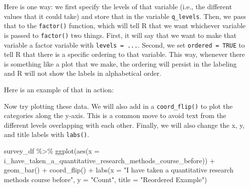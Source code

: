 \documentclass[
]{book}
\newenvironment{Shaded}{\begin{snugshade}}{\end{snugshade}}
\newcommand{\AttributeTok}[1]{\textcolor[rgb]{0.77,0.63,0.00}{#1}}
\newcommand{\ConstantTok}[1]{\textcolor[rgb]{0.00,0.00,0.00}{#1}}
\newcommand{\FunctionTok}[1]{\textcolor[rgb]{0.00,0.00,0.00}{#1}}
\newcommand{\NormalTok}[1]{#1}
\newcommand{\OtherTok}[1]{\textcolor[rgb]{0.56,0.35,0.01}{#1}}
\newcommand{\SpecialCharTok}[1]{\textcolor[rgb]{0.00,0.00,0.00}{#1}}
\newcommand{\StringTok}[1]{\textcolor[rgb]{0.31,0.60,0.02}{#1}}
\begin{document}
Here is one way: we first specify the levels of that variable (i.e., the different values that it could take) and store that in the variable \texttt{q\_levels}. Then, we pass that to the \texttt{factor()} function, which will tell R that we want whichever variable is passed to \texttt{factor()} two things. First, it will say that we want to make that variable a factor variable with \texttt{levels\ =\ ...}. Second, we set \texttt{ordered\ =\ TRUE} to tell R that there is a specific ordering to that variable. This way, whenever there is something like a plot that we make, the ordering will persist in the labeling and R will not show the labels in alphabetical order.

Here is an example of that in action:

\begin{Shaded}
\end{Shaded}

Now try plotting these data. We will also add in a \texttt{coord\_flip()} to plot the categories along the y-axis. This is a common move to avoid text from the different levels overlapping with each other. Finally, we will also change the x, y, and title labels with \texttt{labs()}.

\begin{Shaded}
\begin{Highlighting}[]
\NormalTok{survey\_df }\SpecialCharTok{\%\textgreater{}\%} 
  \FunctionTok{ggplot}\NormalTok{(}\FunctionTok{aes}\NormalTok{(}\AttributeTok{x =}\NormalTok{ i\_have\_taken\_a\_quantitative\_research\_methods\_course\_before)) }\SpecialCharTok{+}
  \FunctionTok{geom\_bar}\NormalTok{() }\SpecialCharTok{+}
  \FunctionTok{coord\_flip}\NormalTok{() }\SpecialCharTok{+}
  \FunctionTok{labs}\NormalTok{(}\AttributeTok{x =} \StringTok{"I have taken a quantitative research methods course before"}\NormalTok{,}
       \AttributeTok{y =} \StringTok{"Count"}\NormalTok{,}
       \AttributeTok{title =} \StringTok{"Reordered Example"}\NormalTok{)}
\end{Highlighting}
\end{Shaded}
\end{document}
